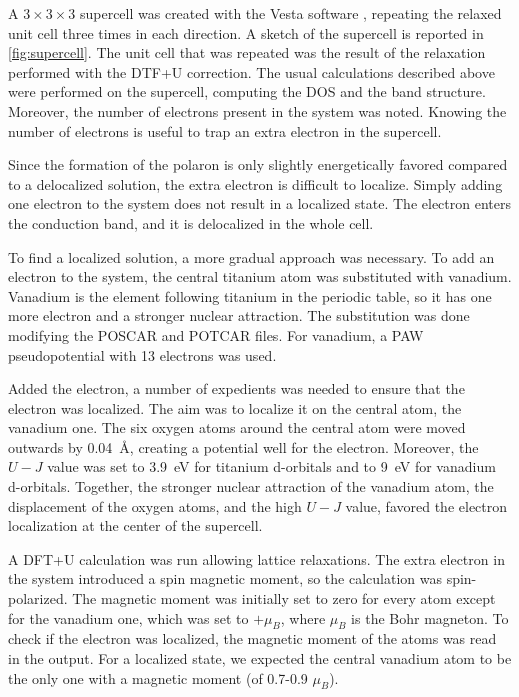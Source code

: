 A $3\times3\times3$ supercell was created with the Vesta software \cite{zotero-174}, repeating the relaxed unit cell three times in each direction. A sketch of the supercell is reported in \cref{fig:supercell}. The unit cell that was repeated was the result of the relaxation performed with the DTF+U correction. The usual calculations described above were performed on the supercell, computing the DOS and the band structure. Moreover, the number of electrons present in the system was noted. Knowing the number of electrons is useful to trap an extra electron in the supercell.

Since the formation of the polaron is only slightly energetically favored compared to a delocalized solution, the extra electron is difficult to localize. Simply adding one electron to the system does not result in a localized state. The electron enters the conduction band, and it is delocalized in the whole cell.

To find a localized solution, a more gradual approach was necessary. To add an electron to the system, the central titanium atom was substituted with vanadium. Vanadium is the element following titanium in the periodic table, so it has one more electron and a stronger nuclear attraction. The substitution was done modifying the POSCAR and POTCAR files. For vanadium, a PAW pseudopotential with 13 electrons was used.

Added the electron, a number of expedients was needed to ensure that the electron was localized. The aim was to localize it on the central atom, the vanadium one. The six oxygen atoms around the central atom were moved outwards by \SI{0.04}{\angstrom}, creating a potential well for the electron. Moreover, the $U-J$ value was set to \SI{3.9}{eV} for titanium d-orbitals and to \SI{9}{eV} for vanadium d-orbitals. Together, the stronger nuclear attraction of the vanadium atom, the displacement of the oxygen atoms, and the high $U-J$ value, favored the electron localization at the center of the supercell.

A DFT+U calculation was run allowing lattice relaxations.  The extra electron in the system introduced a spin magnetic moment, so the calculation was spin-polarized. The magnetic moment was initially set to zero for every atom except for the vanadium one, which was set to $+\mu_B$, where $\mu_B$ is the Bohr magneton. To check if the electron was localized, the magnetic moment of the atoms was read in the output. For a localized state, we expected the central vanadium atom to be the only one with a magnetic moment (of 0.7-0.9 $\mu_B$).

